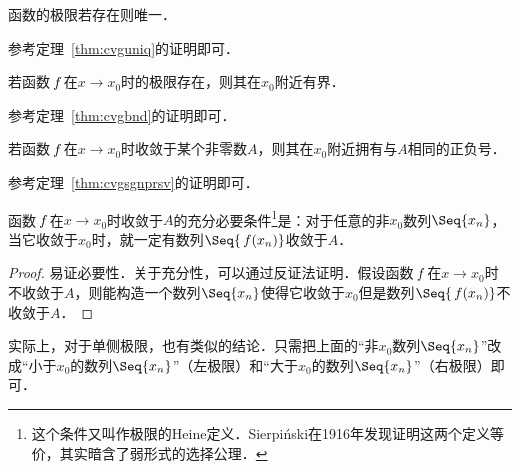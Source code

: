 \begin{theorem*}[唯一性]
  函数的极限若存在则唯一．

  \begin{remark}
    参考定理~\ref{thm:cvguniq}的证明即可．
  \end{remark}
\end{theorem*}

\begin{theorem*}[有界性]
  若函数\(\,f\mkern2mu\)在\(x \to x_0\!\)时的极限存在，则其在\(x_0\)附近有界．

  \begin{remark}
    参考定理~\ref{thm:cvgbnd}的证明即可．
  \end{remark}
\end{theorem*}

\begin{theorem}[保号性]
  \label{thm:limfuncsgnprsv}
  若函数\(\,f\mkern2mu\)在\(x \to x_0\!\)时收敛于某个非零数\(A\)，则其在\(x_0\)附近拥有与\(A\)相同的正负号．

  \begin{remark}
    参考定理~\ref{thm:cvgsgnprsv}的证明即可．
  \end{remark}
\end{theorem}

\begin{theorem}
  \label{thm:limequiv}
  函数\(\,f\mkern2mu\)在\(x \to x_0\!\)时收敛于\(A\)的充分必要条件\footnote{这个条件又叫作极限的Heine定义．Sierpiński在1916年发现证明这两个定义等价，其实暗含了弱形式的选择公理．}是：对于任意的非\(x_0\)数列\(\Seq{x_n}\)，当它收敛于\(x_0\)时，就一定有数列\(\Seq{\,f(x_n)}\)收敛于\(A\)．

  \begin{proof}
    易证必要性．关于充分性，可以通过反证法证明．假设函数\(\,f\mkern2mu\)在\(x \to x_0\!\)时不收敛于\(A\)，则能构造一个数列\(\Seq{x_n}\)使得它收敛于\(x_0\)但是数列\(\Seq{\,f(x_n)}\)不收敛于\(A\)．
  \end{proof}

  \begin{remark}
    实际上，对于单侧极限，也有类似的结论．只需把上面的“非\(x_0\)数列\(\Seq{x_n}\)”改成“小于\(x_0\)的数列\(\Seq{x_n}\)”（左极限）和“大于\(x_0\)的数列\(\Seq{x_n}\)”（右极限）即可．
  \end{remark}
\end{theorem}

